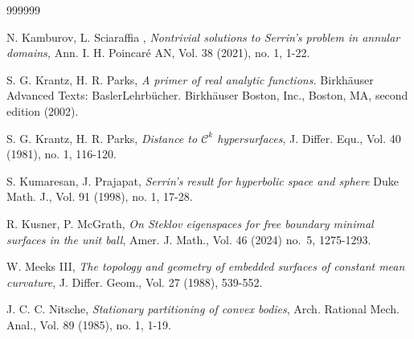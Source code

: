 \documentclass[11pt]{article}
\numberwithin{equation} {section}
\begin{document}
\begin{thebibliography}{999999}
	
	 N. Kamburov, L. Sciaraffia , {\it Nontrivial solutions to Serrin's problem in annular domains,} Ann. I. H. Poincar\'e AN, Vol. 38 (2021), no. 1, 1-22. 
	
	
	
	  S. G. Krantz, H. R. Parks, {\it A primer of real analytic functions.} Birkh\"{a}user Advanced Texts: BaslerLehrb\"{u}cher. Birkh\"{a}user Boston, Inc., Boston, MA, second edition (2002).
	
	 S. G. Krantz, H. R. Parks, \emph{Distance to $\mathcal{C}^k$ hypersurfaces}, J. Differ. Equ., Vol. 40 (1981), no. 1, 116-120.

	 S. Kumaresan, J. Prajapat, {\it Serrin's result for hyperbolic space and sphere} Duke Math. J., Vol. 91 (1998), no. 1, 17-28.
	
	 R. Kusner, P. McGrath,
	\emph{On Steklov eigenspaces for free boundary minimal surfaces in the unit ball},
	Amer. J. Math., Vol. 46 (2024) no.~5, 1275-1293.
	
	
	 W. Meeks III, \emph{The topology and geometry of embedded surfaces of constant mean curvature}, J. Differ. Geom., Vol. 27 (1988), 539-552.
	
	
	
	 J. C. C. Nitsche, {\it Stationary partitioning of convex bodies}, Arch. Rational Mech. Anal., Vol. 89 (1985), no. 1, 1-19.
	
	

\end{thebibliography}
\end{document}
